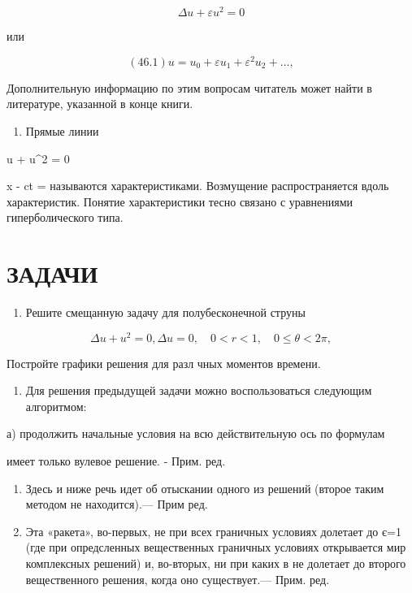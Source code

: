 \documentclass[
  ukrainian,
]{article}
\providecommand{\tightlist}{%
  \setlength{\itemsep}{0pt}\setlength{\parskip}{0pt}}
\begin{document}
\[
\Delta u + \varepsilon u^2 = 0
\]

или

\[
(46.1) u = u_0 + \varepsilon u_1 + \varepsilon^2 u_2 + \dots,
\]

Дополнительную информацию по этим вопросам читатель может найти в
литературе, указанной в конце книги.

\begin{enumerate}
\def\labelenumi{\arabic{enumi}.}
\setcounter{enumi}{2}
\tightlist
\item
  Прямые линии
\end{enumerate}

 u + u\^{}2 = 0

x - ct =  называются характеристиками. Возмущение
распространяется вдоль характеристик. Понятие характеристики тесно
связано с уравнениями гиперболического типа.

\section{ЗАДАЧИ}\label{ux437ux430ux434ux430ux447ux438-4}

\begin{enumerate}
\def\labelenumi{\arabic{enumi}.}
\tightlist
\item
  Решите смещанную задачу для полубесконечной струны
\end{enumerate}

\[
\Delta u + u^2 = 0,
\Delta u = 0, \quad 0 < r < 1, \quad 0 \le \theta < 2\pi,
\]

Постройте графики решения для разл чных моментов времени.

\begin{enumerate}
\def\labelenumi{\arabic{enumi}.}
\setcounter{enumi}{1}
\tightlist
\item
  Для решения предыдущей задачи можно воспользоваться следующим
  алгоритмом:
\end{enumerate}

а) продолжить начальные условия на всю действительную ось по формулам

имеет только вулевое решение. - Прим. ред.

\begin{enumerate}
\def\labelenumi{\arabic{enumi})}
\setcounter{enumi}{1}
\item
  Здесь и ниже речь идет об отыскании одного из решений (второе таким
  методом не находится).--- Прим ред.
\item
  Эта «ракета», во-первых, не при всех граничных условиях долетает до
  є=1 (где при опредсленных вещественных граничных условиях открывается
  мир комплексных решений) и, во-вторых, ни при каких в не долетает до
  второго вещественного решения, когда оно существует.--- Прим. ред.
\end{enumerate}
\end{document}

